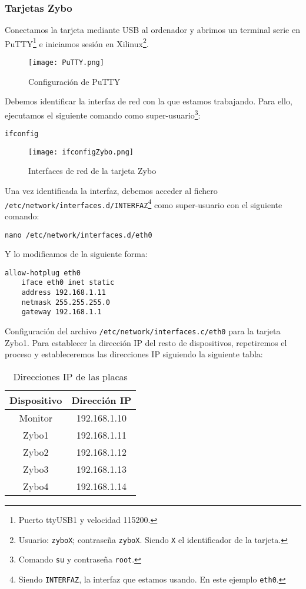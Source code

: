 \documentclass[12pt,letterpaper]{article}
\begin{document}
\newpage

\subsubsection{Tarjetas Zybo}
Conectamos la tarjeta mediante USB al ordenador y abrimos un terminal serie en PuTTY\footnote{Puerto ttyUSB1 y velocidad 115200.} e iniciamos sesión en Xilinux\footnote{Usuario: \texttt{zyboX}; contraseña \texttt{zyboX}. Siendo \texttt{X} el identificador de la tarjeta.}.

\begin{figure}[h]
	\centering
	\texttt{[image: PuTTY.png]}
	\caption{Configuración de PuTTY}
	\label{Configuración de PuTTY}
\end{figure}

Debemos identificar la interfaz de red con la que estamos trabajando. Para ello, ejecutamos el siguiente comando como super-usuario\footnote{Comando \texttt{su} y contraseña \texttt{root}.}:
\begin{center}
	\texttt{ifconfig}
\end{center}
\newpage
\begin{figure}[h]
	\centering
	\texttt{[image: ifconfigZybo.png]}
	\caption{Interfaces de red de la tarjeta Zybo}
	\label{Interfaces de red de la tarjeta Zybo}
\end{figure}

Una vez identificada la interfaz, debemos acceder al fichero\\ \texttt{/etc/network/interfaces.d/INTERFAZ}\footnote{Siendo \texttt{INTERFAZ}, la interfaz que estamos usando. En este ejemplo \texttt{eth0}.} como super-usuario con el siguiente comando:
\begin{center}
	\texttt{nano /etc/network/interfaces.d/eth0}
\end{center}
Y lo modificamos de la siguiente forma:
\begin{lstlisting}
allow-hotplug eth0
    iface eth0 inet static
    address 192.168.1.11
    netmask 255.255.255.0
    gateway 192.168.1.1
\end{lstlisting}
Configuración del archivo \texttt{/etc/network/interfaces.c/eth0} para la tarjeta Zybo1.
\newpage
Para establecer la dirección IP del resto de dispositivos, repetiremos el proceso y estableceremos las direcciones IP siguiendo la siguiente tabla:
\begin{table}[h]
	\centering
	\begin{tabular}{|c|c|}
		\hline
		\textbf{Dispositivo} & \textbf{Dirección IP} \\ \hline
		Monitor & 192.168.1.10 \\ \hline
		Zybo1 & 192.168.1.11 \\ \hline
		Zybo2 & 192.168.1.12 \\ \hline
		Zybo3 & 192.168.1.13 \\ \hline
		Zybo4 & 192.168.1.14 \\ \hline
	\end{tabular}
\caption{Direcciones IP de las placas}
\label{Direcciones IP de las placas}
\end{table}
\end{document}
